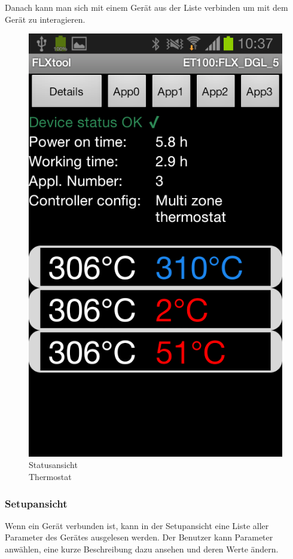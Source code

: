 Danach kann man sich mit einem Gerät aus der Liste verbinden um mit dem Gerät zu interagieren.
\vspace{16pt}

\begin{figure}
	\includegraphics[scale=0.3]{analysis/res/ShowStatusThermostat}
	\caption{Statusansicht \\Thermostat}
\end{figure}

\subsubsection{Setupansicht}
\label{subsubsec:Setupansicht}
Wenn ein Gerät verbunden ist, kann in der Setupansicht eine Liste aller Parameter des Gerätes ausgelesen werden. Der Benutzer kann Parameter anwählen, eine kurze Beschreibung dazu ansehen und deren Werte ändern.

